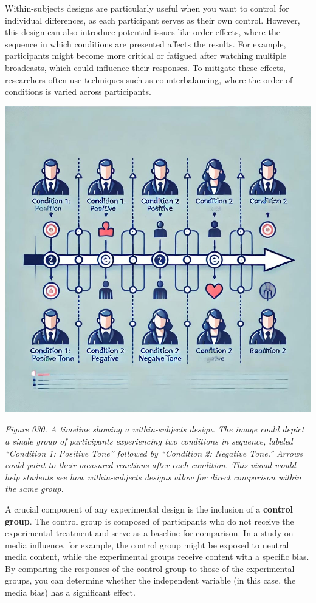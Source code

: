 \documentclass[
]{book}
\begin{document}
Within-subjects designs are particularly useful when you want to control for individual differences, as each participant serves as their own control. However, this design can also introduce potential issues like order effects, where the sequence in which conditions are presented affects the results. For example, participants might become more critical or fatigued after watching multiple broadcasts, which could influence their responses. To mitigate these effects, researchers often use techniques such as counterbalancing, where the order of conditions is varied across participants.

\includegraphics[width=1\textwidth,height=\textheight]{images/fig030.jpg}

\emph{Figure 030. A timeline showing a within-subjects design. The image could depict a single group of participants experiencing two conditions in sequence, labeled ``Condition 1: Positive Tone'' followed by ``Condition 2: Negative Tone.'' Arrows could point to their measured reactions after each condition. This visual would help students see how within-subjects designs allow for direct comparison within the same group.}

A crucial component of any experimental design is the inclusion of a \textbf{control group}. The control group is composed of participants who do not receive the experimental treatment and serve as a baseline for comparison. In a study on media influence, for example, the control group might be exposed to neutral media content, while the experimental groups receive content with a specific bias. By comparing the responses of the control group to those of the experimental groups, you can determine whether the independent variable (in this case, the media bias) has a significant effect.
\end{document}
